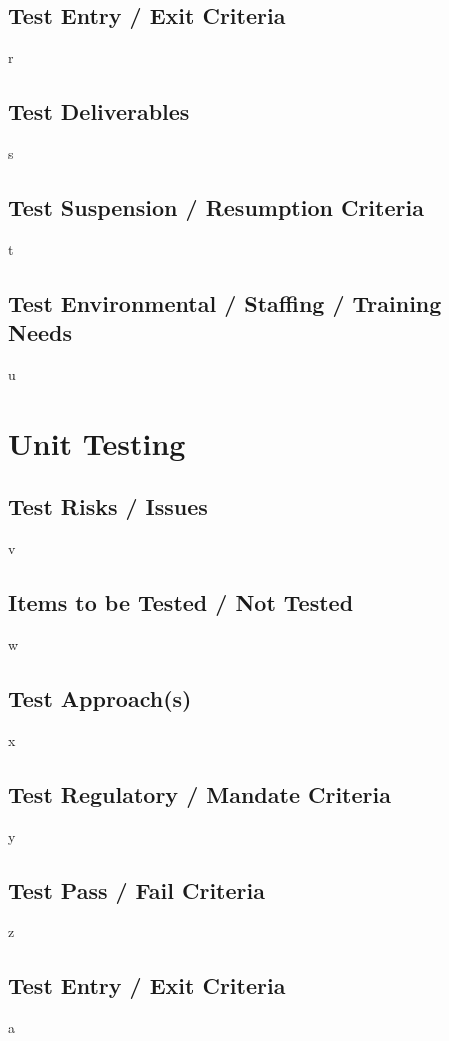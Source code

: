 \documentclass{article}
\begin{document}
\subsection{Test Entry / Exit Criteria}
r

\subsection{Test Deliverables}
s

\subsection{Test Suspension / Resumption Criteria}
t

\subsection{Test Environmental / Staffing / Training Needs}
u

\section{Unit Testing}
\subsection{Test Risks / Issues}
v

\subsection{Items to be Tested / Not Tested}
w

\subsection{Test Approach(s)}
x

\subsection{Test Regulatory / Mandate Criteria}
y

\subsection{Test Pass / Fail Criteria}
z

\subsection{Test Entry / Exit Criteria}
a
\end{document}
